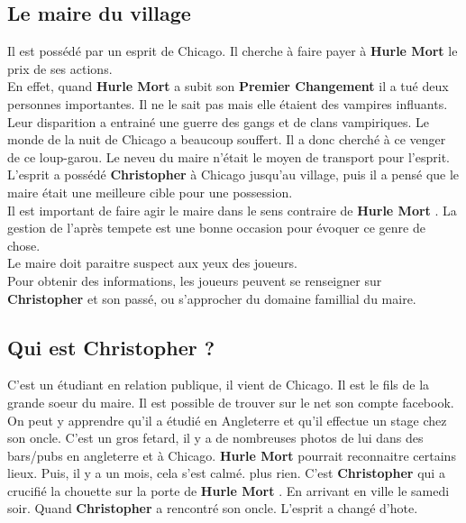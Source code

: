 \documentclass[oneside,12pt]{book}
\newcommand{\Peter}{\textbf{Hurle Mort} }
\newcommand{\Christopher}{\textbf{Christopher} }
\begin{document}
\begin{flushleft}
\section{Le maire du village}
\label{le_maire}
Il est possédé par un esprit de Chicago. Il cherche à faire payer à \Peter le prix de ses actions.\\
En effet, quand \Peter a subit son \textbf{Premier Changement} il a tué deux personnes importantes. Il ne le sait pas mais elle étaient des vampires influants. Leur disparition a entrainé une guerre des gangs et de clans vampiriques. Le monde de la nuit de Chicago a beaucoup souffert. Il a donc cherché à ce venger de ce loup-garou. 
Le neveu du maire n'était le moyen de transport pour l'esprit.
L'esprit a possédé \Christopher à Chicago jusqu'au village, puis il a pensé que le maire était une meilleure cible pour une possession. \\
Il est important de faire agir le maire dans le sens contraire de \Peter . La gestion de l'après tempete est une bonne occasion pour évoquer ce genre de chose.\\ Le maire doit paraitre suspect aux yeux des joueurs. \\ 
Pour obtenir des informations, les joueurs peuvent se renseigner sur \Christopher et son passé, ou s'approcher du domaine famillial du maire. 

\subsection{Qui est \Christopher ?}
\label{Christopher}
C'est un étudiant en relation publique, il vient de Chicago. Il est le fils de la grande soeur du maire. Il est possible de trouver sur le net son compte facebook. On peut y apprendre qu'il a étudié en Angleterre et qu'il effectue un stage chez son oncle. C'est un gros fetard, il y a de nombreuses photos de lui dans des bars/pubs en angleterre et à Chicago. \Peter pourrait reconnaitre certains lieux. 
Puis, il y a un mois, cela s'est calmé. plus rien. C'est \Christopher qui a crucifié la chouette sur la porte de \Peter . En arrivant en ville le samedi soir. Quand \Christopher a rencontré son oncle. L'esprit a changé d'hote. 


\end{flushleft}
\end{document}
